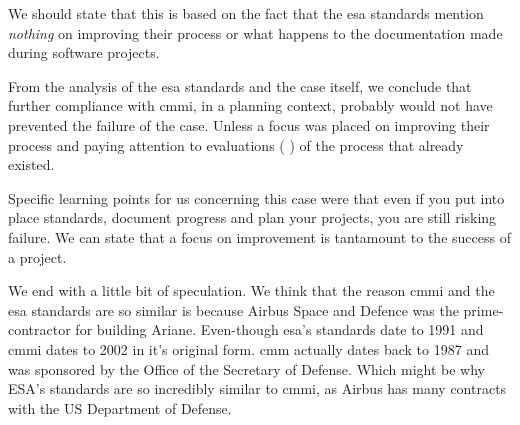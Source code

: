 We should state that this is based on the fact that the \ac{esa} standards mention \textit{nothing} on improving their process or what happens to the documentation made during software projects.

From the analysis of the \ac{esa} standards and the case itself, we conclude that further compliance with \ac{cmmi}, in a planning context, probably would not have prevented the failure of the case. Unless a focus was placed on improving their process and paying attention to evaluations (\citep{monfort1996ariane} \citep{denskat1996development}) of the process that already existed.

Specific learning points for us concerning this case were that even if you put into place standards, document progress and plan your projects, you are still risking failure. We can state that a focus on improvement is tantamount to the success of a project.

We end with a little bit of speculation. We think that the reason \ac{cmmi} and the \ac{esa} standards are so similar is because Airbus Space and Defence was the prime-contractor for building Ariane. Even-though \ac{esa}'s standards date to 1991 and \ac{cmmi} dates to 2002 in it's original form. \ac{cmm} actually dates back to 1987 and was sponsored by the Office of the Secretary of Defense. Which might be why ESA's standards are so incredibly similar to \ac{cmmi}, as Airbus has many contracts with the US Department of Defense.


